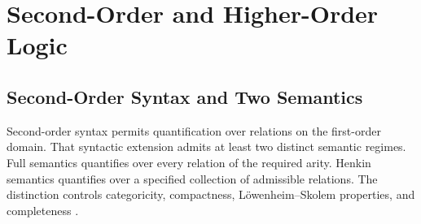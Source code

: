 \part{Second-Order and Higher-Order Logic}
\label{part:higher-order}

\chapter{Second-Order Syntax and Two Semantics}
\label{ch:second-order-logic}

Second-order syntax permits quantification over relations on the first-order
domain.  That syntactic extension admits at least two distinct semantic regimes.  Full semantics quantifies over every relation of the
required arity.  Henkin semantics quantifies over a specified collection of
admissible relations.  The distinction controls categoricity, compactness,
L\"owenheim--Skolem properties, and completeness
\cite{Henkin1950,BarwiseFeferman1985}.

